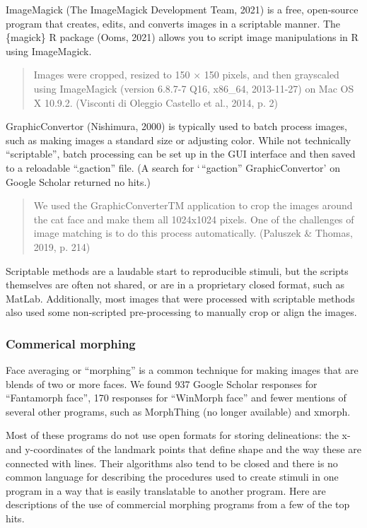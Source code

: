 \documentclass[
  doc,floatsintext]{apa6}
\begin{document}
ImageMagick (The ImageMagick Development Team, 2021) is a free, open-source program that creates, edits, and converts images in a scriptable manner. The \{magick\} R package (Ooms, 2021) allows you to script image manipulations in R using ImageMagick.

\begin{quote}
Images were cropped, resized to 150 × 150 pixels, and then grayscaled using ImageMagick (version 6.8.7-7 Q16, x86\_64, 2013-11-27) on Mac OS X 10.9.2. (Visconti di Oleggio Castello et al., 2014, p. 2)
\end{quote}

GraphicConvertor (Nishimura, 2000) is typically used to batch process images, such as making images a standard size or adjusting color. While not technically ``scriptable'', batch processing can be set up in the GUI interface and then saved to a reloadable ``.gaction'' file. (A search for `\,``gaction'' GraphicConvertor' on Google Scholar returned no hits.)

\begin{quote}
We used the GraphicConverterTM application to crop the images around the cat face and make them all 1024x1024 pixels. One of the challenges of image matching is to do this process automatically. (Paluszek \& Thomas, 2019, p. 214)
\end{quote}

Scriptable methods are a laudable start to reproducible stimuli, but the scripts themselves are often not shared, or are in a proprietary closed format, such as MatLab. Additionally, most images that were processed with scriptable methods also used some non-scripted pre-processing to manually crop or align the images.

\hypertarget{commerical-morphing}{%
\subsubsection{Commerical morphing}\label{commerical-morphing}}

Face averaging or ``morphing'' is a common technique for making images that are blends of two or more faces. We found 937 Google Scholar responses for ``Fantamorph face'', 170 responses for ``WinMorph face'' and fewer mentions of several other programs, such as MorphThing (no longer available) and xmorph.

Most of these programs do not use open formats for storing delineations: the x- and y-coordinates of the landmark points that define shape and the way these are connected with lines. Their algorithms also tend to be closed and there is no common language for describing the procedures used to create stimuli in one program in a way that is easily translatable to another program. Here are descriptions of the use of commercial morphing programs from a few of the top hits.
\end{document}
